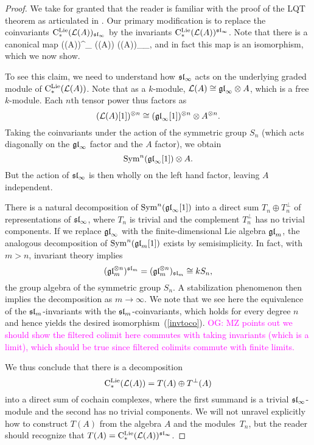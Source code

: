 \documentclass[11pt]{amsart}
\numberwithin{equation}{section}
\def\owen{\textcolor{magenta}{OG: }\textcolor{magenta}}
\begin{document}
\begin{proof}
We take for granted that the reader is familiar with the proof of the LQT theorem as articulated in \cite{LQ, Weibel, LodayCyclic}.
Our primary modification is to replace the coinvariants $\cliels(\cL(A))_{\sl_\infty}$ by the invariants $\cliels(\cL(A))^{\sl_\infty}$.
Note that there is a canonical map
\beqn\label{invtoco}
\cliels(\cL(A))^{\sl_\infty} \hookrightarrow \cliels(\cL(A)) \to \cliels(\cL(A))_{\sl_\infty},
\eeqn
and in fact this map is an isomorphism, which we now show.

To see this claim, we need to understand how $\sl_\infty$ acts on the underlying graded module of $\cliels(\cL(A))$. Note that as a $k$-module, $\cL(A) \cong \gl_\infty \otimes A$, which is a free $k$-module. 
Each $n$th tensor power thus factors as
\[
(\cL(A)[1])^{\otimes n} \cong (\gl_\infty[1])^{\otimes n} \otimes A^{\otimes n}.
\]
Taking the coinvariants under the action of the symmetric group $S_n$
(which acts diagonally on the $\gl_\infty$ factor and the $A$ factor),
we obtain
\[
\Sym^n (\gl_\infty[1]) \otimes A.
\]
But the action of $\sl_\infty$ is then wholly on the left hand factor, leaving $A$ independent.

There is a natural decomposition of $\Sym^n (\gl_\infty[1])$ into a direct sum $T_n \oplus T_n^\perp$ of representations of $\sl_\infty$, where $T_n$ is trivial and the complement $T_n^\perp$ has no trivial components.
If we replace $\gl_\infty$ with the finite-dimensional Lie algebra $\gl_m$, 
the analogous decomposition of $\Sym^n (\gl_m[1])$ exists by semisimplicity. 
In fact, with $m > n$, invariant theory implies
\[
(\gl_m^{\otimes n})^{\sl_m} = (\gl_m^{\otimes n})_{\sl_m} \cong k S_n,
\]  
the group algebra of the symmetric group $S_n$.
A stabilization phenomenon then implies the decomposition as $m \to \infty$.
We note that we see here the equivalence of the $\sl_m$-invariants with the $\sl_m$-coinvariants,
which holds for every degree $n$ and hence yields the desired isomorphism~(\ref{invtoco}).
\owen{MZ points out we should show the filtered colimit here commutes with taking invariants (which is a limit), 
which should be true since filtered colimits commute with finite limits.}

We thus conclude that there is a decomposition
\[
\cliels(\cL(A)) = T(A) \oplus T^\perp(A)
\]
into a direct sum of cochain complexes,
where the first summand is a trivial $\sl_\infty$-module and the second has no trivial components.
We will not unravel explicitly how to construct $T(A)$ from the algebra $A$ and the modules~$T_n$,
but the reader should recognize that $T(A) = \cliels(\cL(A))^{\sl_\infty}$.


\end{proof}
\end{document}
